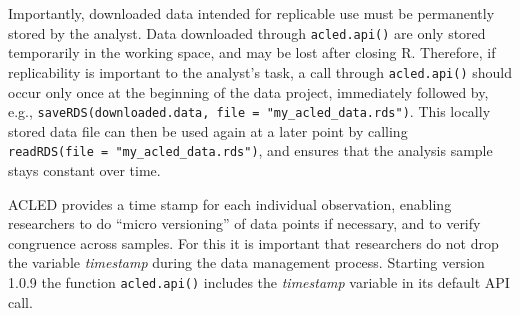 \documentclass[
]{article}
\begin{document}
Importantly, downloaded data intended for replicable use must be
permanently stored by the analyst. Data downloaded through
\texttt{acled.api()} are only stored temporarily in the working space,
and may be lost after closing R. Therefore, if replicability is
important to the analyst's task, a call through \texttt{acled.api()}
should occur only once at the beginning of the data project, immediately
followed by, e.g.,
\texttt{saveRDS(downloaded.data,\ file\ =\ "my\_acled\_data.rds")}. This
locally stored data file can then be used again at a later point by
calling \texttt{readRDS(file\ =\ "my\_acled\_data.rds")}, and ensures
that the analysis sample stays constant over time.

ACLED provides a time stamp for each individual observation, enabling
researchers to do ``micro versioning'' of data points if necessary, and
to verify congruence across samples. For this it is important that
researchers do not drop the variable \emph{timestamp} during the data
management process. Starting version 1.0.9 the function
\texttt{acled.api()} includes the \emph{timestamp} variable in its
default API call.
\end{document}
